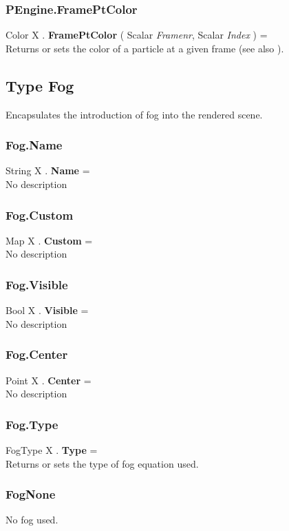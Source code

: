\subsubsection{PEngine.FramePtColor \label{F:PEngine:FramePtColor}}
Color X . \textbf{FramePtColor} ( Scalar \textit{Framenr}, Scalar \textit{Index} ) = \\
Returns or sets the color of a particle at a given frame (see also ).

\subsection{Type Fog \label{T:Fog}}
Encapsulates the introduction of fog into the rendered scene.

\subsubsection{Fog.Name \label{F:Fog:Name}}
String X . \textbf{Name} = \\
No description

\subsubsection{Fog.Custom \label{F:Fog:Custom}}
Map X . \textbf{Custom} = \\
No description

\subsubsection{Fog.Visible \label{F:Fog:Visible}}
Bool X . \textbf{Visible} = \\
No description

\subsubsection{Fog.Center \label{F:Fog:Center}}
Point X . \textbf{Center} = \\
No description

\subsubsection{Fog.Type \label{F:Fog:Type}}
FogType X . \textbf{Type} = \\
Returns or sets the type of fog equation used.

\subsubsection{FogNone \label{T:FogType|FogNone}}
No fog used.

